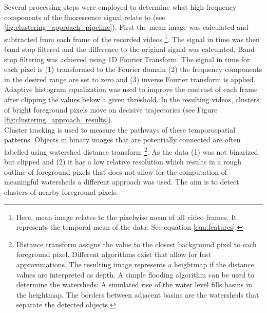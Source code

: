 Several processing steps were employed to determine what high frequency components of the fluorescence signal relate to (see \ref{fig:clustering_approach_pipeline}). First the mean image was calculated and subtracted from each frame of the recorded videos \footnote{Here, mean image relates to the pixelwise mean of all video frames. It represents the temporal mean of the data. See equation \ref{eqn:features}.}. The signal in time was then band stop filtered and the difference to the original signal was calculated. Band stop filtering was achieved using 1D Fourier Transform. The signal in time for each pixel is (1) transformed to the Fourier domain (2) the frequency components in the desired range are set to zero and (3) inverse Fourier transform is applied. Adaptive histogram equalization was used to improve the contrast of each frame after clipping the values below a given threshold. In the resulting videos, clusters of bright foreground pixels move on decisive trajectories (see Figure \ref{fig:clustering_approach_results}).\\
Cluster tracking is used to measure the pathways of these temporospatial patterns. Objects in binary images that are potentially connected are often labelled using watershed distance transform \parencite{arganda-carreras2016distance} \footnote{Distance transform assigns the value to the closest background pixel to each foreground pixel. Different algorithms exist that allow for fast approximations. The resulting image represents a heightmap if the distance values are interpreted as depth. A simple flooding algorithm can be used to determine the watersheds: A simulated rise of the water level fills basins in the heightmap. The borders between adjacent basins are the watersheds that separate the detected objects.}. As the data (1) was not binarized but clipped and (2) it has a low relative resolution which results in a rough outline of foreground pixels that does not allow for the computation of meaningful watersheds a different approach was used. The aim is to detect clusters of nearby foreground pixels. \\

